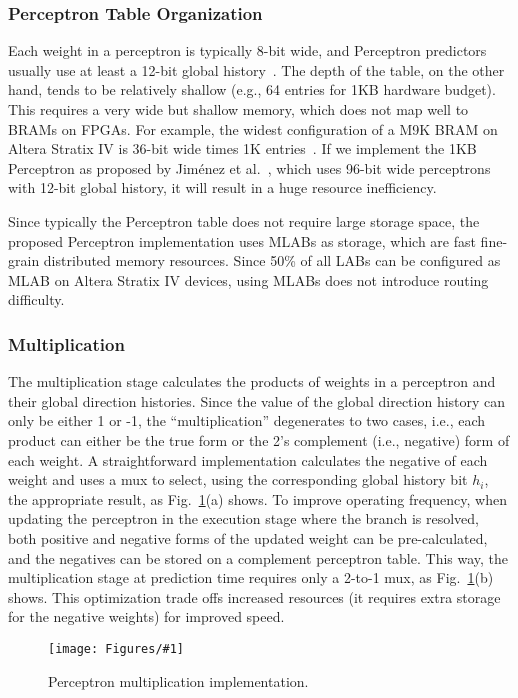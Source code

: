 \documentclass[conference]{IEEEtran}
\newcommand{\kfig}[4]{ %
        \begin{figure}[!t]
        \centering
        \texttt{[image: Figures/\#1]}
        \vspace{-1mm}
        \caption{#3}
        \vspace{-6mm}
        \label{#2}
        \end{figure}
}
\begin{document}
\subsubsection{Perceptron Table Organization}
\label{sec:fpga:perceptron:table}
Each weight in a perceptron is typically 8-bit wide, and Perceptron predictors usually use at least a 12-bit global history~\cite{perceptron}. The depth of the table, on the other hand, tends to be relatively shallow (e.g., 64 entries for 1KB hardware budget). This requires a very wide but shallow memory, which does not map well to BRAMs on FPGAs. For example, the widest configuration of a M9K BRAM on Altera Stratix IV is 36-bit wide times 1K entries~\cite{StratixIVM9K}. If we implement the 1KB Perceptron as proposed by Jim\'enez et al.~\cite{perceptron}, which uses 96-bit wide perceptrons with 12-bit global history, it will result in a huge resource inefficiency. 

Since typically the Perceptron table does not require large storage space, the proposed Perceptron implementation uses MLABs as storage, which are fast fine-grain distributed memory resources. Since 50\% of all LABs can be configured as MLAB on Altera Stratix IV devices, using MLABs does not introduce routing difficulty.


\subsubsection{Multiplication}
\label{sec:fpga:perceptron:mult}
The multiplication stage calculates the products of weights in a perceptron and their global direction histories. Since the value of the global direction history can only be either 1 or -1, the ``multiplication'' degenerates to two cases, i.e., each product can either be the true form or the 2's complement (i.e., negative) form of each weight. A straightforward implementation calculates the negative of each weight and uses a mux to select, using the corresponding global history bit $h_i$, the appropriate result, as Fig.~\ref{fig:perceptronMult}(a) shows. To improve operating frequency, when updating the perceptron in the execution stage where the branch is resolved, both positive and negative forms of the updated weight can be pre-calculated, and the negatives can be stored on a complement perceptron table. This way, the multiplication stage at prediction time requires only a 2-to-1 mux, as Fig.~\ref{fig:perceptronMult}(b) shows. This optimization trade offs increased resources (it requires extra storage for the negative weights) for improved speed.
\kfig{perceptronMult.pdf}{fig:perceptronMult}{Perceptron multiplication implementation.}{angle = 0, trim = 0.3in 2.2in 3in 0.6in, clip, width=0.3\textwidth}
\end{document}
